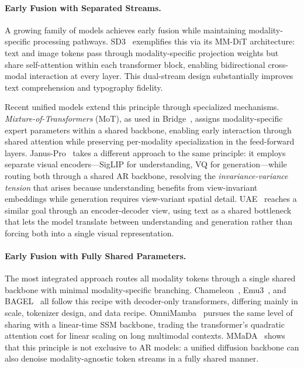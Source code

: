 \paragraph{Early Fusion with Separated Streams.}
A growing family of models achieves early fusion while maintaining modality-specific processing pathways. SD3~\citep{esser2024stablediffusion3} exemplifies this via its MM-DiT architecture: text and image tokens pass through modality-specific projection weights but share self-attention within each transformer block, enabling bidirectional cross-modal interaction at every layer. This dual-stream design substantially improves text comprehension and typography fidelity.

Recent unified models extend this principle through specialized mechanisms. \emph{Mixture-of-Transformers} (MoT), as used in Bridge~\citep{wang2025bridge}, assigns modality-specific expert parameters within a shared backbone, enabling early interaction through shared attention while preserving per-modality specialization in the feed-forward layers. Janus-Pro~\citep{chen2025janusprounifiedmultimodalunderstanding} takes a different approach to the same principle: it employs separate visual encoders---SigLIP for understanding, VQ for generation---while routing both through a shared AR backbone, resolving the \emph{invariance-variance tension} that arises because understanding benefits from view-invariant embeddings while generation requires view-variant spatial detail. UAE~\citep{yan2025uae} reaches a similar goal through an encoder-decoder view, using text as a shared bottleneck that lets the model translate between understanding and generation rather than forcing both into a single visual representation.

\paragraph{Early Fusion with Fully Shared Parameters.}
The most integrated approach routes all modality tokens through a single shared backbone with minimal modality-specific branching. Chameleon~\citep{chameleon2024}, Emu3~\citep{wang2024emu3}, and BAGEL~\citep{deng2025bagelemerging} all follow this recipe with decoder-only transformers, differing mainly in scale, tokenizer design, and data recipe. OmniMamba~\citep{zou2025omnimamba} pursues the same level of sharing with a linear-time SSM backbone, trading the transformer's quadratic attention cost for linear scaling on long multimodal contexts. MMaDA~\citep{yang2025mmada} shows that this principle is not exclusive to AR models: a unified diffusion backbone can also denoise modality-agnostic token streams in a fully shared manner.

